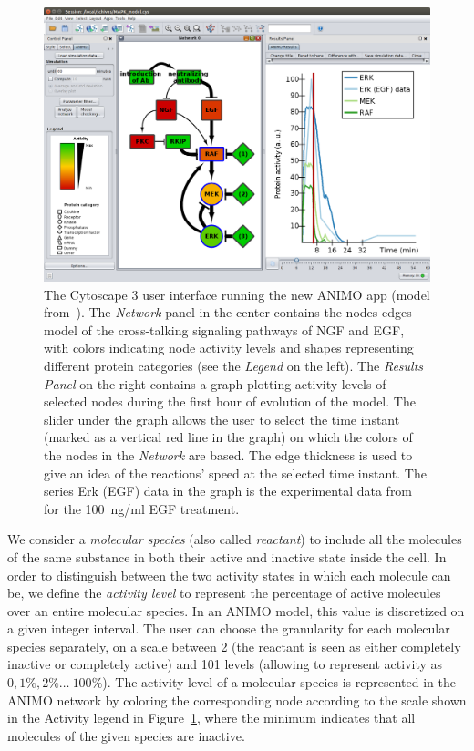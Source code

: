 \documentclass{llncs}
\begin{document}
\begin{figure}[htb]
\begin{center}
   \includegraphics[width=.7\textwidth]{images/ANIMO3_MAPK_model} %
\end{center}\vspace{-.5cm}
\caption{\scriptsize The Cytoscape 3 user interface running the new ANIMO app
(model from~\cite{animo-ieee}). The \emph{Network} panel in the center contains the nodes-edges
model of the cross-talking signaling pathways of NGF and EGF, with
colors indicating node activity levels and shapes representing different protein categories (see the \emph{Legend} on the left).
The \emph{Results Panel} on the right contains a graph plotting activity levels of selected nodes
during the first hour of evolution of the model. The slider under the graph
allows the user to select the time instant (marked as a vertical red line in the graph) on which
the colors of the nodes in the \emph{Network} are based. The edge thickness is used to give an idea %
of the reactions' speed
at the selected time instant.
The series {\sf Erk (EGF) data} in the graph is the experimental
data from~\cite{egf-ngf} for the 100~ng/ml EGF treatment.
\label{fig:cytoscape}}
\vspace{-.4cm}
\end{figure}

We consider a \emph{molecular species} (also called \emph{reactant}) to include all the molecules of the same substance in both their active
and inactive state inside the cell. In order to distinguish between the two activity states in which each molecule can be,
we define the \emph{activity level}
to represent the percentage of active molecules over an entire molecular species. In an ANIMO model, this value
is discretized on a given integer interval. 
The user can choose the granularity for each molecular species separately, on a scale between 2 (the
reactant is seen as either completely inactive or completely active) and 101 levels (allowing to represent activity as $0, 1\%, 2\% \dots\ 100\%$).
The activity level of a molecular species is represented in the ANIMO network
by coloring the corresponding node according to the scale shown in the {\sf Activity} legend in Figure~\ref{fig:cytoscape},
where the minimum indicates that all molecules of the given species are inactive.
\end{document}
